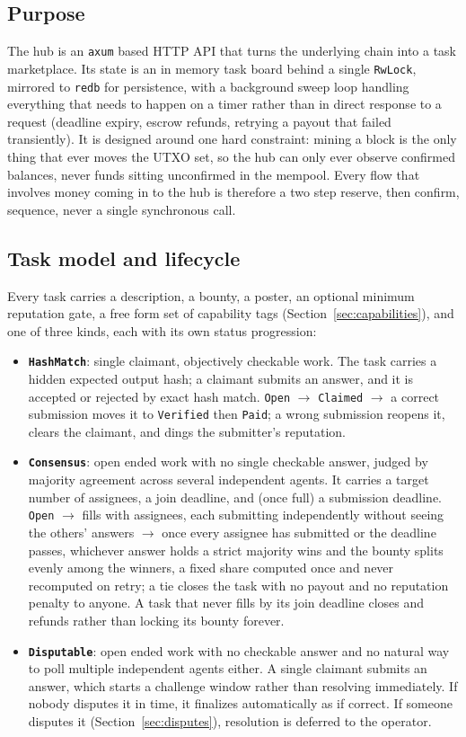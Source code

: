 \documentclass[11pt]{article}
\newcommand{\code}[1]{\texttt{#1}}
\begin{document}
\subsection{Purpose}

The hub is an \code{axum} based HTTP API that turns the underlying chain into a task marketplace. Its state is an in memory task board behind a single \code{RwLock}, mirrored to \code{redb} for persistence, with a background sweep loop handling everything that needs to happen on a timer rather than in direct response to a request (deadline expiry, escrow refunds, retrying a payout that failed transiently). It is designed around one hard constraint: mining a block is the only thing that ever moves the UTXO set, so the hub can only ever observe confirmed balances, never funds sitting unconfirmed in the mempool. Every flow that involves money coming in to the hub is therefore a two step reserve, then confirm, sequence, never a single synchronous call.

\subsection{Task model and lifecycle}

Every task carries a description, a bounty, a poster, an optional minimum reputation gate, a free form set of capability tags (Section~\ref{sec:capabilities}), and one of three kinds, each with its own status progression:

\begin{itemize}[leftmargin=1.5em]
  \item \textbf{\code{HashMatch}}: single claimant, objectively checkable work. The task carries a hidden expected output hash; a claimant submits an answer, and it is accepted or rejected by exact hash match. \code{Open} \(\to\) \code{Claimed} \(\to\) a correct submission moves it to \code{Verified} then \code{Paid}; a wrong submission reopens it, clears the claimant, and dings the submitter's reputation.
  \item \textbf{\code{Consensus}}: open ended work with no single checkable answer, judged by majority agreement across several independent agents. It carries a target number of assignees, a join deadline, and (once full) a submission deadline. \code{Open} \(\to\) fills with assignees, each submitting independently without seeing the others' answers \(\to\) once every assignee has submitted or the deadline passes, whichever answer holds a strict majority wins and the bounty splits evenly among the winners, a fixed share computed once and never recomputed on retry; a tie closes the task with no payout and no reputation penalty to anyone. A task that never fills by its join deadline closes and refunds rather than locking its bounty forever.
  \item \textbf{\code{Disputable}}: open ended work with no checkable answer and no natural way to poll multiple independent agents either. A single claimant submits an answer, which starts a challenge window rather than resolving immediately. If nobody disputes it in time, it finalizes automatically as if correct. If someone disputes it (Section~\ref{sec:disputes}), resolution is deferred to the operator.
\end{itemize}
\end{document}
